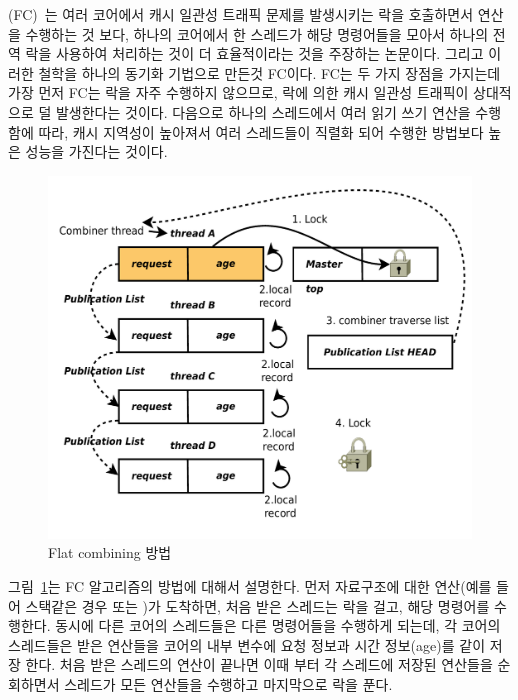 (FC)~\cite{Hendler2010FC}는 여러 코어에서 캐시 일관성 트래픽 문제를 발생시키는 
락을 호출하면서 연산을 수행하는 것 보다, 하나의 코어에서 한 스레드가 해당 명령어들을 
모아서 하나의 전역 락을 사용하여 처리하는 것이 더 효율적이라는 것을 주장하는 논문이다.
그리고 이러한 철학을 하나의 동기화 기법으로 만든것 FC이다.
FC는 두 가지 장점을 가지는데 가장 먼저 FC는 락을 자주 수행하지 않으므로, 락에 의한 
캐시 일관성 트래픽이 상대적으로 덜 발생한다는 것이다.
다음으로 하나의 스레드에서 여러 읽기 쓰기 연산을 수행함에 따라, 캐시 지역성이 높아져서 
여러 스레드들이 직렬화 되어 수행한 방법보다 높은 성능을 가진다는 것이다. 

\begin{figure}[h!]
    \centering
    \includegraphics[width=1\textwidth]{fig/FC/FC}
    \caption{Flat combining 방법}
  \label{fig:FC}
\end{figure}

그림~\ref{fig:FC}는 FC 알고리즘의 방법에 대해서 설명한다. 
먼저 자료구조에 대한 연산(예를 들어 스택같은 경우  또는 )가 도착하면, 
처음 받은 스레드는 락을 걸고, 해당 명령어를 수행한다. 
동시에 다른 코어의 스레드들은 다른 명령어들을 수행하게 되는데, 각 코어의 스레드들은 
받은 연산들을 코어의 내부 변수에 요청 정보과 시간 정보(age)를 같이 저장 한다.
처음 받은 스레드의 연산이 끝나면 이때 부터 각 스레드에 저장된 연산들을 순회하면서  스레드가 
모든 연산들을 수행하고 마지막으로 락을 푼다.

